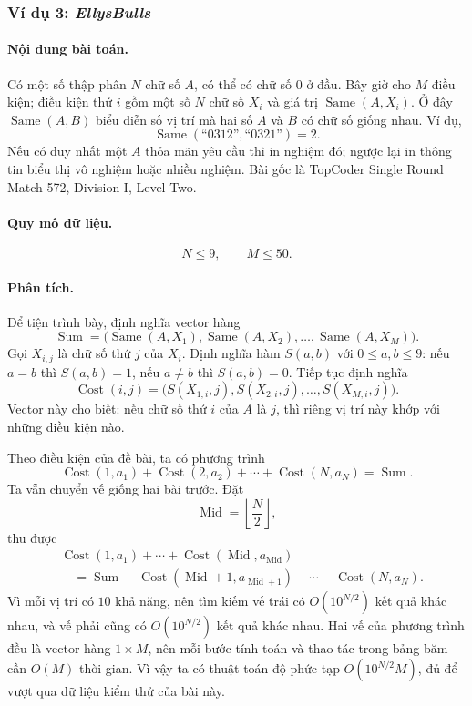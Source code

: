 \documentclass[11pt]{article}
\begin{document}
\subsubsection{Ví dụ 3: \emph{EllysBulls}}

\paragraph{Nội dung bài toán.}
Có một số thập phân \(N\) chữ số \(A\), có thể có chữ số \(0\) ở đầu. Bây giờ
cho \(M\) điều kiện; điều kiện thứ \(i\) gồm một số \(N\) chữ số \(X_i\) và
giá trị \(\operatorname{Same}(A,X_i)\). Ở đây \(\operatorname{Same}(A,B)\)
biểu diễn số vị trí mà hai số \(A\) và \(B\) có chữ số giống nhau. Ví dụ,
\[
  \operatorname{Same}(\text{``0312''},\text{``0321''})=2.
\]
Nếu có duy nhất một \(A\) thỏa mãn yêu cầu thì in nghiệm đó; ngược lại in
thông tin biểu thị vô nghiệm hoặc nhiều nghiệm. Bài gốc là TopCoder Single
Round Match 572, Division I, Level Two.

\paragraph{Quy mô dữ liệu.}
\[
  N\le 9,\qquad M\le 50.
\]

\paragraph{Phân tích.}
Để tiện trình bày, định nghĩa vector hàng
\[
  \operatorname{Sum}
  =
  \bigl(\operatorname{Same}(A,X_1),\operatorname{Same}(A,X_2),
  \ldots,\operatorname{Same}(A,X_M)\bigr).
\]
Gọi \(X_{i,j}\) là chữ số thứ \(j\) của \(X_i\). Định nghĩa hàm \(S(a,b)\)
với \(0\le a,b\le 9\): nếu \(a=b\) thì \(S(a,b)=1\), nếu \(a\ne b\) thì
\(S(a,b)=0\). Tiếp tục định nghĩa
\[
  \operatorname{Cost}(i,j)
  =
  \bigl(S(X_{1,i},j),S(X_{2,i},j),\ldots,S(X_{M,i},j)\bigr).
\]
Vector này cho biết: nếu chữ số thứ \(i\) của \(A\) là \(j\), thì riêng vị
trí này khớp với những điều kiện nào.

Theo điều kiện của đề bài, ta có phương trình
\[
  \operatorname{Cost}(1,a_1)+\operatorname{Cost}(2,a_2)+\cdots+
  \operatorname{Cost}(N,a_N)=\operatorname{Sum}.
\]
Ta vẫn chuyển vế giống hai bài trước. Đặt
\[
  \operatorname{Mid}=\left\lfloor\frac{N}{2}\right\rfloor,
\]
thu được
\[
\begin{aligned}
  &\operatorname{Cost}(1,a_1)+\cdots+\operatorname{Cost}(\operatorname{Mid},a_{\operatorname{Mid}})\\
  &\quad=
  \operatorname{Sum}
  -\operatorname{Cost}(\operatorname{Mid}+1,a_{\operatorname{Mid}+1})
  -\cdots-\operatorname{Cost}(N,a_N).
\end{aligned}
\]
Vì mỗi vị trí có \(10\) khả năng, nên tìm kiếm vế trái có
\(O(10^{N/2})\) kết quả khác nhau, và vế phải cũng có \(O(10^{N/2})\) kết
quả khác nhau. Hai vế của phương trình đều là vector hàng \(1\times M\), nên
mỗi bước tính toán và thao tác trong bảng băm cần \(O(M)\) thời gian. Vì vậy
ta có thuật toán độ phức tạp \(O(10^{N/2}M)\), đủ để vượt qua dữ liệu kiểm
thử của bài này.
\end{document}
